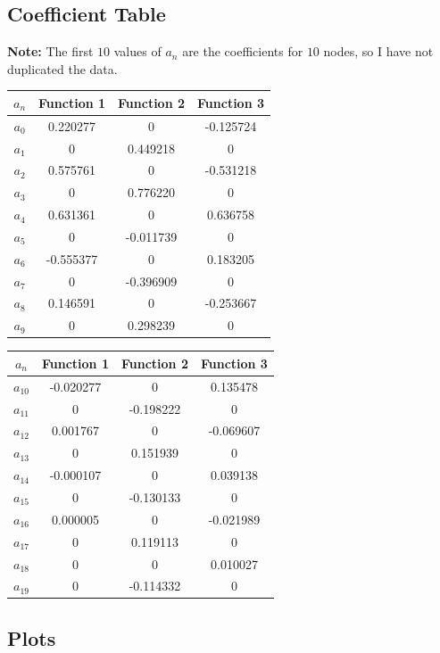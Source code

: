 \documentclass[11pt]{article} %
\begin{document}
{\subsection*{Coefficient Table}
\textbf{Note:} The first $10$ values of $a_n$ are the coefficients for $10$ nodes, so I have not duplicated the data.
\begin{table}[H]
\begin{tabular}{| c |c c c |}
\hline
$a_n$ & Function 1 & Function 2 & Function 3 \\
\hline
$a_0$ & 0.220277& 0 & -0.125724\\
$a_1$ & 0 &0.449218 & 0\\
$a_2$ &0.575761 & 0& -0.531218\\
$a_3$ & 0 &0.776220 & 0\\
$a_4$ &0.631361 & 0& 0.636758\\
$a_5$ & 0 &-0.011739& 0\\
$a_6$ &-0.555377 & 0& 0.183205\\
$a_7$ & 0 & -0.396909& 0\\
$a_8$ &0.146591 & 0&  -0.253667\\
$a_9$ & 0 & 0.298239& 0\\

\hline
\end{tabular}
\begin{tabular}{| c |c c c |}
\hline
$a_n$ & Function 1 & Function 2 & Function 3 \\
\hline
$a_{10}$ &-0.020277 & 0 & 0.135478 \\
$a_{11}$ &0 & -0.198222& 0\\
$a_{12}$ &0.001767 & 0 & -0.069607\\
$a_{13}$ &0 & 0.151939& 0\\
$a_{14}$ &-0.000107 & 0 & 0.039138\\
$a_{15}$ &0 & -0.130133& 0\\
$a_{16}$ &0.000005 & 0 & -0.021989\\
$a_{17}$ &0 &0.119113 & 0\\
$a_{18}$ &0 & 0 & 0.010027 \\
$a_{19}$ &0 & -0.114332& 0\\
\hline
\end{tabular}
\end{table}

\subsection*{Plots}


}
\end{document}
